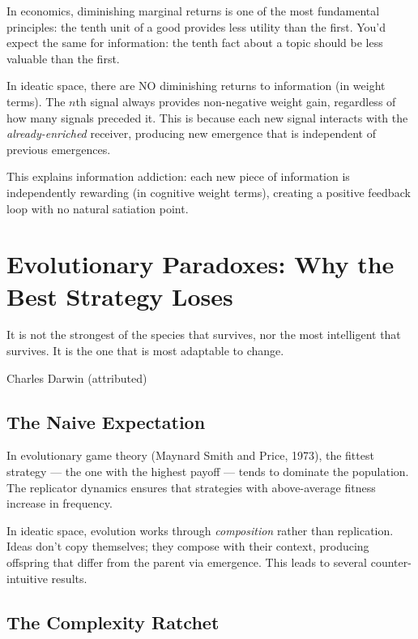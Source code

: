 \begin{paradox}
In economics, diminishing marginal returns is one of the most fundamental principles: the tenth unit of a good provides less utility than the first. You'd expect the same for information: the tenth fact about a topic should be less valuable than the first.

In ideatic space, there are NO diminishing returns to information (in weight terms). The $n$th signal always provides non-negative weight gain, regardless of how many signals preceded it. This is because each new signal interacts with the \emph{already-enriched} receiver, producing new emergence that is independent of previous emergences.

This explains information addiction: each new piece of information is independently rewarding (in cognitive weight terms), creating a positive feedback loop with no natural satiation point.
\end{paradox}


\chapter{Evolutionary Paradoxes: Why the Best Strategy Loses}

\epigraph{It is not the strongest of the species that survives, nor the most intelligent that survives. It is the one that is most adaptable to change.}{Charles Darwin (attributed)}

\section{The Naive Expectation}

In evolutionary game theory (Maynard Smith and Price, 1973), the fittest strategy --- the one with the highest payoff --- tends to dominate the population. The replicator dynamics ensures that strategies with above-average fitness increase in frequency.

In ideatic space, evolution works through \emph{composition} rather than replication. Ideas don't copy themselves; they compose with their context, producing offspring that differ from the parent via emergence. This leads to several counter-intuitive results.

\section{The Complexity Ratchet}

